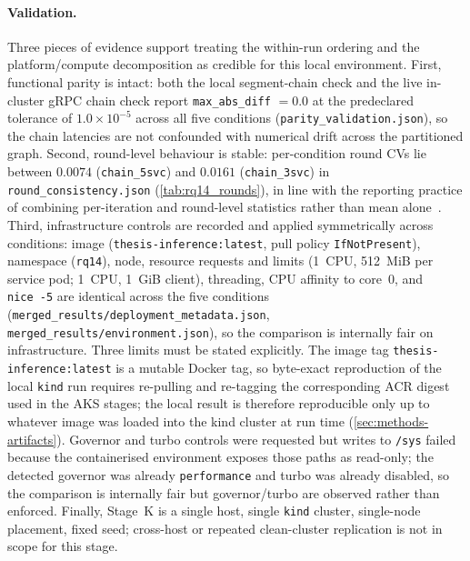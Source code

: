 \paragraph{Validation.}
Three pieces of evidence support treating the within-run ordering and
the platform/compute decomposition as credible for this local
environment. First, functional parity is intact: both the local
segment-chain check and the live in-cluster gRPC chain check report
\texttt{max\_abs\_diff} \(=0.0\) at the predeclared tolerance of
\(1.0\times10^{-5}\) across all five conditions
(\texttt{parity\_validation.json}), so the chain latencies are not
confounded with numerical drift across the partitioned graph. Second,
round-level behaviour is stable: per-condition round CVs lie between
\(0.0074\) (\texttt{chain\_5svc}) and \(0.0161\)
(\texttt{chain\_3svc}) in \texttt{round\_consistency.json}
(\cref{tab:rq14_rounds}), in line with the reporting practice of
combining per-iteration and round-level statistics rather than mean
alone~\cite{benchmarking_sc15}. Third, infrastructure controls are
recorded and applied symmetrically across conditions: image
(\texttt{thesis-inference:latest}, pull policy \texttt{IfNotPresent}),
namespace (\texttt{rq14}), node, resource requests and limits
(1~CPU, 512~MiB per service pod; 1~CPU, 1~GiB client), threading,
CPU affinity to core~0, and \texttt{nice~-5} are identical across the
five conditions
(\texttt{merged\_results/deployment\_metadata.json},
\texttt{merged\_results/environment.json}), so the comparison is
internally fair on infrastructure. Three limits must be stated
explicitly. The image tag \texttt{thesis-inference:latest} is a
mutable Docker tag, so byte-exact reproduction of the local
\texttt{kind} run requires re-pulling and re-tagging the
corresponding ACR digest used in the AKS stages; the local result is
therefore reproducible only up to whatever image was loaded into the
kind cluster at run time (\cref{sec:methods-artifacts}). Governor
and turbo controls were requested but writes to \texttt{/sys} failed
because the containerised environment exposes those paths as
read-only; the detected governor was already \texttt{performance} and
turbo was already disabled, so the comparison is internally fair but
governor/turbo are observed rather than enforced. Finally, Stage~K is
a single host, single \texttt{kind} cluster, single-node placement,
fixed seed; cross-host or repeated clean-cluster replication is not
in scope for this stage.

